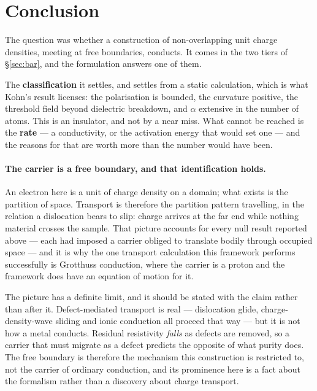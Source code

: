 \documentclass[11pt]{article}
\begin{document}
\section{Conclusion}\label{sec:conclusion}

The question was whether a construction of non-overlapping unit charge densities, meeting at free
boundaries, conducts. It comes in the two tiers of \S\ref{sec:bar}, and the formulation answers one
of them.

The \textbf{classification} it settles, and settles from a static calculation, which is what Kohn's
result licenses: the polarisation is bounded, the curvature positive, the threshold field beyond
dielectric breakdown, and $\alpha$ extensive in the number of atoms. This is an insulator, and not
by a near miss. What cannot be reached is the \textbf{rate} --- a conductivity, or the activation
energy that would set one --- and the reasons for that are worth more than the number would have
been.

\paragraph{The carrier is a free boundary, and that identification holds.} An electron here is a
unit of charge density on a domain; what exists is the partition of space. Transport is therefore
the partition pattern travelling, in the relation a dislocation bears to slip: charge arrives at the
far end while nothing material crosses the sample. That picture accounts for every null result
reported above --- each had imposed a carrier obliged to translate bodily through occupied space ---
and it is why the one transport calculation this framework performs successfully is Grotthuss
conduction, where the carrier is a proton and the framework does have an equation of motion for it.

The picture has a definite limit, and it should be stated with the claim rather than after it.
Defect-mediated transport is real --- dislocation glide, charge-density-wave sliding and ionic
conduction all proceed that way --- but it is not how a metal conducts. Residual resistivity
\emph{falls} as defects are removed, so a carrier that must migrate as a defect predicts the
opposite of what purity does. The free boundary is therefore the mechanism this construction is
restricted to, not the carrier of ordinary conduction, and its prominence here is a fact about the
formalism rather than a discovery about charge transport.
\end{document}
